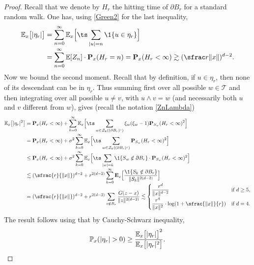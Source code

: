 \begin{proof}
Recall that we denote by $H_r$ the hitting time of $\partial B_r$
for a standard random walk.
One has, using \eqref{Green2} for the last inequality,\vspace*{-3pt}
\begin{align*}
\mathbb E_x\big[|\eta_r|\big] & = \sum_{n=0}^\infty
\mathbb E_x\Big[\ts\sum_{|u|=n} \1\{u \in \eta_r \}\Big]\\[-3pt]
&=
\sum_{n=0}^\infty \mathbb E[Z_n] \cdot \mathbf P_x(H_r = n)
= \mathbf P_x(H_r<\infty ) \gtrsim (\sfrac r{\|x\|})^{d-2}.
\end{align*}
Now we bound the second moment.
Recall that by definition, if $u\in \eta_r$, then none of its descendant can be in $\eta_r$. Thus summing first over all possible
$w\in \mathbf{\mathcal T}$
and then integrating over all possible $u\neq v$, with $u\wedge v=w$
(and necessarily both $u$ and $v$ different from $w$), gives (recall the notation \eqref{ZnLambda})\vspace*{-3pt}
\begin{align*}
\mathbb E_x\big[|\eta_r|^2\big] & =
\mathbf P_x(H_r<\infty) + \sum_{k=0}^\infty
\mathbb E_x \Big[\ts\sum_{w\in \mathcal Z_k((\partial B_r)^c)} \xi_w(\xi_w-1)
\mathbf P_{S_w}(H_r<\infty)^2 \Big] \\[-3pt]
& = \mathbf P_x(H_r<\infty) + \sigma^2 \sum_{k=0}^\infty
\mathbb E_x\Big[\ts\sum_{w\in \mathcal Z_k((\partial B_r)^c)} \mathbf P_{S_w}(H_r<\infty)^2 \Big] \\[-3pt]
&\le \mathbf P_x(H_r<\infty) + \sigma^2 \sum_{k=0}^\infty
\mathbb E_x \Big[\ts\sum_{|w| = k} \1\{S_w\notin \partial B_r\}\cdot
\mathbf P_{S_w}(H_r<\infty)^2 \Big]\\[-3pt]
&\lesssim (\sfrac{r}{\|x\|})^{d-2} + r^{2(d-2)}\sum_{k=0}^\infty
\mathbf E_x\Big[\frac{\1\{S_k \notin \partial B_r\}}{\|S_k\|^{2(d-2)}}\Big]\\[-5pt]
&= (\sfrac{r}{\|x\|})^{d-2} + r^{2(d-2)}\sum_{z\notin B_r} \frac{G(z-x)}{\|z\|^{2(d-2)}}\lesssim
\begin{cases}
\dfrac{r^d}{\|x\|^{d-2}} & \text{if }d\ge 5, \\[7pt]
\dfrac{r^4}{\|x\|^2} \cdot \log (1+\sfrac{\|x\|}{r}) & \text{if }d=4.
\end{cases}
\end{align*}
The result follows using that by Cauchy-Schwarz inequality,
\[
\mathbb P_x(|\eta_r|>0) \ge \frac{\mathbb E_x\big[|\eta_r|\big]^2}{\mathbb E_x\big[|\eta_r|^2\big]}.\qedhere
\]
\end{proof}

